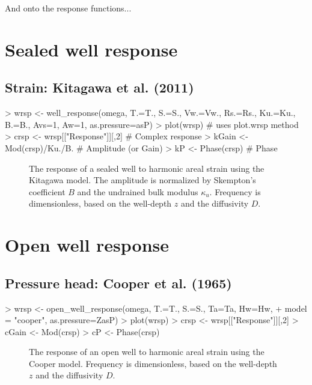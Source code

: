 \documentclass[12pt]{article}
\begin{document}
And onto the response functions...

\clearpage
\section{Sealed well response}

\subsection{Strain: Kitagawa et al. (2011)}
%
\begin{Schunk}
\begin{Sinput}
> wrsp <- well_response(omega, T.=T., S.=S., Vw.=Vw., Rs.=Rs., Ku.=Ku., B.=B., Avs=1, Aw=1, as.pressure=asP)
> plot(wrsp) # uses plot.wrsp method
> crsp <- wrsp[["Response"]][,2]	# Complex response
> kGain <- Mod(crsp)/Ku./B.			# Amplitude (or Gain)
> kP <- Phase(crsp)				# Phase
\end{Sinput}
\end{Schunk}

\begin{figure}[htb!]
\begin{center}
\caption{The response of a sealed well to harmonic areal strain using
the Kitagawa model. The amplitude is normalized by Skempton's coefficient $B$
and the undrained bulk modulus $\kappa_u$.
Frequency is dimensionless, based on the well-depth $z$ and the diffusivity $D$.
}
\label{fig:wrsp}
\end{center}
\end{figure}

\clearpage
\section{Open well response}

\subsection{Pressure head: Cooper et al. (1965)}

\begin{Schunk}
\begin{Sinput}
> wrsp <- open_well_response(omega, T.=T., S.=S., Ta=Ta, Hw=Hw, 
+ 	model = "cooper", as.pressure=ZasP)
> plot(wrsp)
> crsp <- wrsp[["Response"]][,2]
> cGain <- Mod(crsp)
> cP <- Phase(crsp)
\end{Sinput}
\end{Schunk}

\begin{figure}[htb!]
\begin{center}
\caption{The response of an open well to harmonic areal strain using
the Cooper model. 
Frequency is dimensionless, based on the well-depth $z$ and the diffusivity $D$.
}
\label{fig:owrsp-coop}
\end{center}
\end{figure}
\end{document}
